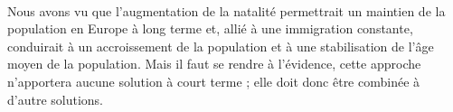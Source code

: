 \paragraph{}Nous avons vu que l’augmentation de la natalité permettrait un maintien de la population en Europe à long terme et, allié à une immigration constante, conduirait à un accroissement de la population et à une stabilisation de l'âge moyen de la population. Mais il faut se rendre à l’évidence, cette approche n'apportera aucune solution à court terme ; elle doit donc être combinée à d’autre solutions.  
